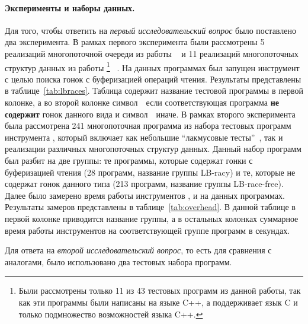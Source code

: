 \paragraph{Эксперименты и наборы данных.} 

Для того, чтобы ответить на \emph{первый исследовательский вопрос} 
было поставлено два эксперимента. 
В рамках первого эксперимента были рассмотрены 
5 реализаций многопоточной очереди из работы%
~\cite{Kokologiannakis:PLDI2019}
и 11 реализаций многопоточных структур данных из работы%
\footnote{Были рассмотрены только 11 из 43 
тестовых программ из данной работы, 
так как эти программы были написаны на языке C++,
а \genmc поддерживает язык C и только подмножество возможностей языка C++.}
~\cite{Ou-Demsky:OOPSLA18}.
На данных программах был запущен инструмент \wmc с целью 
поиска гонок с буферизацией операций чтения.
Результаты представлены в таблице~\ref{tab:lbraces}.
Таблица содержит название тестовой программы в первой колонке, 
а во второй колонке символ~\cmark~если соответствующая 
программа \textbf{не содержит} гонок данного вида 
и символ~\xmark~иначе.
В рамках второго эксперимента была рассмотрена 241 многопоточная программа 
из набора тестовых программ инструмента \genmc, 
который включает как небольшие ``лакмусовые тесты''~\cite{Alglave-al:TACAS2011}, 
так и реализации различных многопоточных структур данных.
Данный набор программ был разбит на две группы:
те программы, которые содержат гонки с буферизацией чтения 
(28 программ, название группы LB-racy)
и те, которые не содержат гонок данного типа 
(213 программ, название группы LB-race-free).
Далее было замерено время работы инструментов \genmc, \hmc и \wmc на данных программах.  
Результаты замеров представлены в таблице~\ref{tab:overhead}.
В данной таблице в первой колонке приводится название группы, 
а в остальных колонках суммарное время работы инструментов 
на соответствующей группе программ в секундах.





Для ответа на \emph{второй исследовательский вопрос}, 
то есть для сравнения \wmc с аналогами, 
было использовано два тестовых набора программ.

